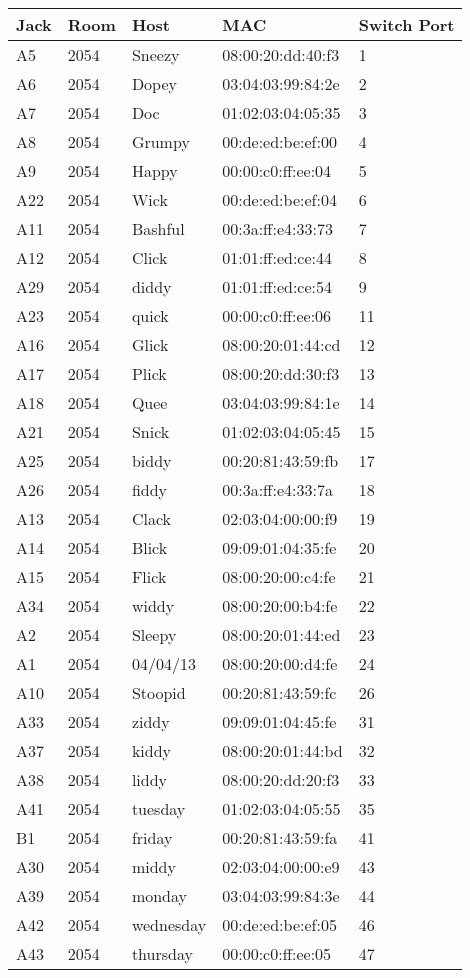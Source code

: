 \documentclass{article}
\begin{document}
\begin{tabular}{| l | l | l | l | l |}
\hline
Jack & Room & Host & MAC & Switch Port \\
\hline
A5 & 2054 & Sneezy & 08:00:20:dd:40:f3 & 1 \\
\hline
A6 & 2054 & Dopey & 03:04:03:99:84:2e & 2 \\
\hline
A7 & 2054 & Doc & 01:02:03:04:05:35 & 3 \\
\hline
A8 & 2054 & Grumpy & 00:de:ed:be:ef:00 & 4 \\
\hline
A9 & 2054 & Happy & 00:00:c0:ff:ee:04 & 5 \\
\hline
A22 & 2054 & Wick & 00:de:ed:be:ef:04 & 6 \\
\hline
A11 & 2054 & Bashful & 00:3a:ff:e4:33:73 & 7 \\
\hline
A12 & 2054 & Click & 01:01:ff:ed:ce:44 & 8 \\
\hline
A29 & 2054 & diddy & 01:01:ff:ed:ce:54 & 9 \\
\hline
A23 & 2054 & quick & 00:00:c0:ff:ee:06 & 11 \\
\hline
A16 & 2054 & Glick & 08:00:20:01:44:cd & 12 \\
\hline
A17 & 2054 & Plick & 08:00:20:dd:30:f3 & 13 \\
\hline
A18 & 2054 & Quee & 03:04:03:99:84:1e & 14 \\
\hline
A21 & 2054 & Snick & 01:02:03:04:05:45 & 15 \\
\hline
A25 & 2054 & biddy & 00:20:81:43:59:fb & 17 \\
\hline
A26 & 2054 & fiddy & 00:3a:ff:e4:33:7a & 18 \\
\hline
A13 & 2054 & Clack & 02:03:04:00:00:f9 & 19 \\
\hline
A14 & 2054 & Blick & 09:09:01:04:35:fe & 20 \\
\hline
A15 & 2054 & Flick & 08:00:20:00:c4:fe & 21 \\
\hline
A34 & 2054 & widdy & 08:00:20:00:b4:fe & 22 \\
\hline
A2 & 2054 & Sleepy & 08:00:20:01:44:ed & 23 \\
\hline
A1 & 2054 & 04/04/13 & 08:00:20:00:d4:fe & 24 \\
\hline
A10 & 2054 & Stoopid & 00:20:81:43:59:fc & 26 \\
\hline
A33 & 2054 & ziddy & 09:09:01:04:45:fe & 31 \\
\hline
A37 & 2054 & kiddy & 08:00:20:01:44:bd & 32 \\
\hline
A38 & 2054 & liddy & 08:00:20:dd:20:f3 & 33 \\
\hline
A41 & 2054 & tuesday & 01:02:03:04:05:55 & 35 \\
\hline
B1 & 2054 & friday & 00:20:81:43:59:fa & 41 \\
\hline
A30 & 2054 & middy & 02:03:04:00:00:e9 & 43 \\
\hline
A39 & 2054 & monday & 03:04:03:99:84:3e & 44 \\
\hline
A42 & 2054 & wednesday & 00:de:ed:be:ef:05 & 46 \\
\hline
A43 & 2054 & thursday & 00:00:c0:ff:ee:05 & 47 \\
\hline
\end{tabular}
\end{document}
